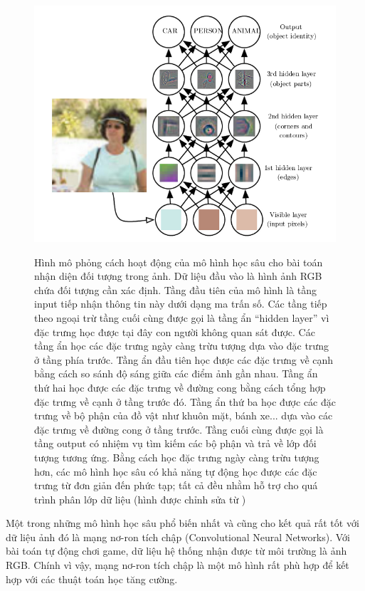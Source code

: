 	\begin{figure}
		\centering
		\includegraphics[width=\textwidth]{deep_learning_example}
		\label{fig_dl_Example}
		\caption[Hình mô phỏng cách hoạt động của mô hình học sâu]{Hình mô phỏng cách hoạt động của mô hình học sâu cho bài toán nhận diện đối tượng trong ảnh.
		Dữ liệu đầu vào là hình ảnh RGB chứa đối tượng cần xác định. Tầng đầu tiên của mô hình là tầng input tiếp nhận thông tin này dưới dạng ma trấn số. 
		Các tầng tiếp theo ngoại trừ tầng cuối cùng được gọi là tầng ẩn ``hidden layer'' vì đặc trưng học được tại đây con người không quan sát được. 
		Các tầng ẩn học các đặc trưng ngày càng trừu tượng dựa vào đặc trưng ở tầng phía trước. 
		Tầng ẩn đầu tiên học được các đặc trưng về cạnh bằng cách so sánh độ sáng giữa các điểm ảnh gần nhau. 
		Tầng ẩn thứ hai học được các đặc trưng về đường cong bằng cách tổng hợp đặc trưng về cạnh ở tầng trước đó. 
		Tầng ẩn thứ ba học được các đặc trưng về bộ phận của đồ vật như khuôn mặt, bánh xe... dựa vào các đặc trưng về đường cong ở tầng trước. 
		Tầng cuối cùng được gọi là tầng output có nhiệm vụ tìm kiếm các bộ phận và trả về lớp đối tượng tương ứng. 
		Bằng cách học đặc trưng ngày càng trừu tượng hơn, các mô hình học sâu có khả năng tự động học được các đặc trưng từ đơn giản đến phức tạp; tất cả đều nhằm hỗ trợ cho quá trình phân lớp dữ liệu (hình được chỉnh sửa từ \cite{Goodfellow-et-al-2016-Book})}
	\end{figure}
	
	Một trong những mô hình học sâu phổ biến nhất và cũng cho kết quả rất tốt với dữ liệu ảnh \cite{lecun2015deep} đó là mạng nơ-ron tích chập (Convolutional Neural Networks).
	Với bài toán tự động chơi game, dữ liệu hệ thống nhận được từ môi trường là ảnh RGB.
	Chính vì vậy, mạng nơ-ron tích chập là một mô hình rất phù hợp để kết hợp với các thuật toán học tăng cường.
	
